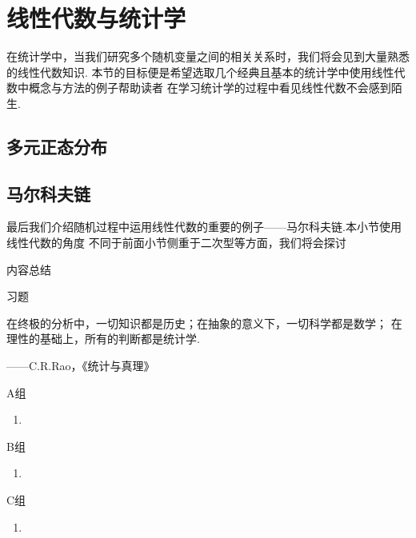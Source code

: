 \chapter{线性代数与统计学}

在统计学中，当我们研究多个随机变量之间的相关关系时，我们将会见到大量熟悉的线性代数知识.
本节的目标便是希望选取几个经典且基本的统计学中使用线性代数中概念与方法的例子帮助读者
在学习统计学的过程中看见线性代数不会感到陌生.

\section{多元正态分布}


\section{马尔科夫链}
最后我们介绍随机过程中运用线性代数的重要的例子——马尔科夫链.本小节使用线性代数的角度
不同于前面小节侧重于二次型等方面，我们将会探讨

\vspace{2ex}
\centerline{\heiti \Large 内容总结}

\vspace{2ex}

\centerline{\heiti \Large 习题}
\vspace{2ex}
{\kaishu 在终极的分析中，一切知识都是历史；在抽象的意义下，一切科学都是数学；
在理性的基础上，所有的判断都是统计学.}
\begin{flushright}
    \kaishu
    ——C.R.Rao，《统计与真理》
\end{flushright}
\centerline{\heiti A组}
\begin{enumerate}
    \item
\end{enumerate}
\centerline{\heiti B组}
\begin{enumerate}
    \item
\end{enumerate}
\centerline{\heiti C组}
\begin{enumerate}
    \item
\end{enumerate}
